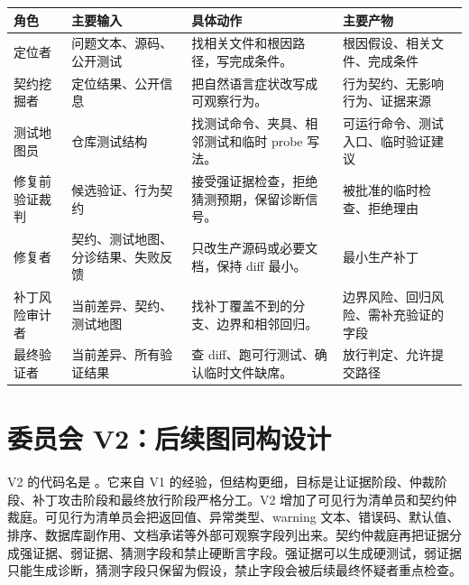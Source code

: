 \documentclass[UTF8,a4paper,11pt]{ctexart}
\newcommand{\wf}[1]{\texttt{\detokenize{#1}}}
\begin{document}
\begin{center}
{\small
\setlength{\tabcolsep}{3pt}
\begin{tabular}{L{2.8cm} L{4.0cm} L{4.0cm} L{3.3cm}}
\toprule
角色 & 主要输入 & 具体动作 & 主要产物 \\
\midrule
定位者 & 问题文本、源码、公开测试 & 找相关文件和根因路径，写完成条件。 & 根因假设、相关文件、完成条件 \\
契约挖掘者 & 定位结果、公开信息 & 把自然语言症状改写成可观察行为。 & 行为契约、无影响行为、证据来源 \\
测试地图员 & 仓库测试结构 & 找测试命令、夹具、相邻测试和临时 probe 写法。 & 可运行命令、测试入口、临时验证建议 \\
修复前验证裁判 & 候选验证、行为契约 & 接受强证据检查，拒绝猜测预期，保留诊断信号。 & 被批准的临时检查、拒绝理由 \\
修复者 & 契约、测试地图、分诊结果、失败反馈 & 只改生产源码或必要文档，保持 diff 最小。 & 最小生产补丁 \\
补丁风险审计者 & 当前差异、契约、测试地图 & 找补丁覆盖不到的分支、边界和相邻回归。 & 边界风险、回归风险、需补充验证的字段 \\
最终验证者 & 当前差异、所有验证结果 & 查 diff、跑可行测试、确认临时文件缺席。 & 放行判定、允许提交路径 \\
\bottomrule
\end{tabular}
}
\end{center}

\section{委员会 V2：后续图同构设计}

V2 的代码名是 \wf{swe-committee-v2}。它来自 V1 的经验，但结构更细，目标是让证据阶段、仲裁阶段、补丁攻击阶段和最终放行阶段严格分工。V2 增加了可见行为清单员和契约仲裁庭。可见行为清单员会把返回值、异常类型、warning 文本、错误码、默认值、排序、数据库副作用、文档承诺等外部可观察字段列出来。契约仲裁庭再把证据分成强证据、弱证据、猜测字段和禁止硬断言字段。强证据可以生成硬测试，弱证据只能生成诊断，猜测字段只保留为假设，禁止字段会被后续最终怀疑者重点检查。
\end{document}
